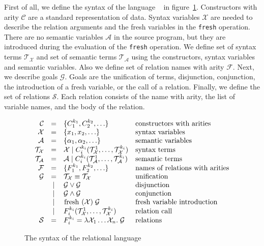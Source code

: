 First of all, we define the syntax of the language \mk~ in figure~\ref{fair:syntax}.
Constructors with arity $\mathcal{C}$ are a standard representation of data.
Syntax variables $\mathcal{X}$ are needed to describe the relation arguments and the fresh variables in the \lstinline{fresh} operation.
There are no semantic variables $\mathcal{A}$ in the source program, but they are introduced during the evaluation of the \lstinline{fresh} operation.
We define set of syntax terms $\mathcal{T}_\mathcal{X}$ and set of semantic terms $\mathcal{T}_\mathcal{A}$ using the constructors, syntax variables and semantic variables.
Also we define set of relation names with arity $\mathcal{F}$.
Next, we describe goals $\mathcal{G}$. Goals are the unification of terms, disjunction, conjunction, the introduction of a fresh variable, or the call of a relation.
Finally, we define the set of relations $\mathcal{S}$. Each relation consists of the name with arity, the list of variable names, and the body of the relation.

\begin{figure}[h]
\[
  \begin{array}{rcll}
     \mathcal{C} & = & \{ C_1^{k_1}, C_2^{k_2}, \ldots \}
     & \mbox{constructors with arities}
     \\
     \mathcal{X} & = & \{x_1, x_2, \ldots \}
     & \mbox{syntax variables}
     \\
     \mathcal{A} & = & \{\alpha_1, \alpha_2, \ldots \}
     & \mbox{semantic variables}
     \\
     \mathcal{T}_\mathcal{X} & = & \mathcal{X} \mid C_i^{k_i}(\mathcal{T}_\mathcal{X}^1, \ldots, \mathcal{T}_\mathcal{X}^{k_i})
     & \mbox{syntax terms}
     \\
     \mathcal{T}_\mathcal{A} & = & \mathcal{A} \mid C_i^{k_i}(\mathcal{T}_\mathcal{A}^1, \ldots, \mathcal{T}_\mathcal{A}^{k_i})
     & \mbox{semantic terms}
     \\
     \mathcal{F} & = & \{F_1^{k_1}, F_2^{k_2}, \ldots \}
     & \mbox{names of relations with arities}
     \\
     \mathcal{G} & =    & \mathcal{T}_\mathcal{X} \equiv \mathcal{T}_\mathcal{X} & \mbox{unification} \\
                 & \mid & \mathcal{G} \lor \mathcal{G} & \mbox{disjunction} \\
                 & \mid & \mathcal{G} \land \mathcal{G} & \mbox{conjunction} \\
                 & \mid & \mbox{\lstinline|fresh|} \; (\mathcal{X}) \; \mathcal{G} & \mbox{fresh variable introduction} \\
                 & \mid &  F_i^{k_i}(\mathcal{T}_\mathcal{X}^1, \ldots, \mathcal{T}_\mathcal{X}^{k_i}) & \mbox{relation call} \\
    \mathcal{S} & = &F_i^{k_i} = \lambda \mathcal{X}_1 \ldots \mathcal{X}_n. \; \mathcal{G} & \mbox{relations}
  \end{array}
\]
    \caption{The syntax of the relational language}
    \label{fair:syntax}
\end{figure}

